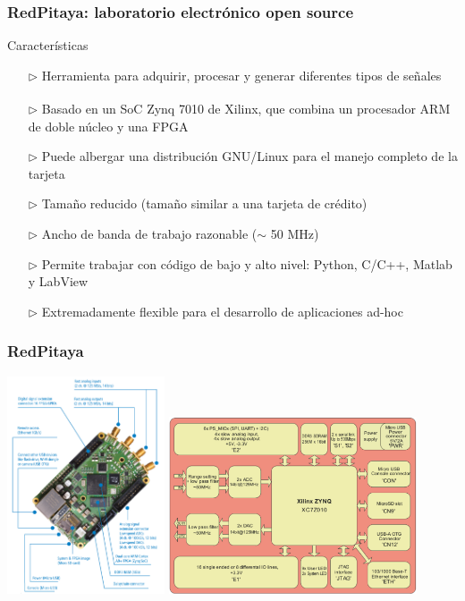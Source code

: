 \documentclass{beamer}
\begin{document}
\begin{frame}
  \frametitle{RedPitaya: laboratorio electrónico open source}
  \begin{block}{Características}
    \begin{itemize}
  \item[$\triangleright$] \alert{Herramienta para adquirir, procesar y generar
diferentes tipos de señales}
  \item[$\triangleright$] Basado en un {\color{blue} SoC
Zynq\textsuperscript{\textregistered} 7010 de
Xilinx}, que combina un procesador ARM de doble núcleo y una FPGA
  \item[$\triangleright$] Puede albergar una distribución
{\color{blue}GNU/Linux} para el manejo completo de la tarjeta
  \item[$\triangleright$] Tamaño reducido (tamaño similar a una tarjeta de
crédito)
  \item[$\triangleright$] Ancho de banda de trabajo razonable ($\sim$ 50 MHz)
  \item[$\triangleright$] Permite trabajar con código de bajo y alto nivel:
Python, C/C++, Matlab y LabView
  \item[$\triangleright$] {\color[rgb]{0.64,0.0,0.0} Extremadamente flexible
para el desarrollo de aplicaciones ad-hoc}
    \end{itemize}
  \end{block}
\end{frame}

\begin{frame}
\frametitle{RedPitaya}
\begin{center}
\hspace{-2mm}\includegraphics[width=0.35\textwidth]{rp_sistema_2}
\hspace{10mm}\includegraphics[width=0.55\textwidth]{rp_sistema}
\end{center}
\end{frame} 
\end{document}

